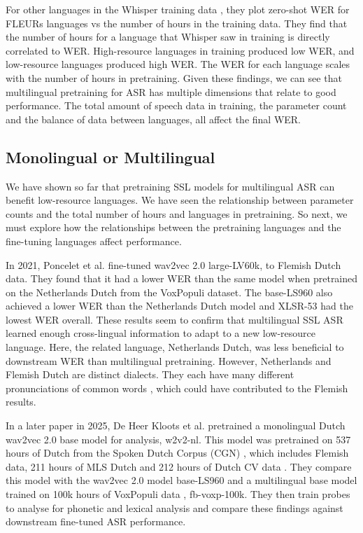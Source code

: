 For other languages in the Whisper training data \cite{whisper}, they plot zero-shot WER for FLEURs \cite{FLEURS} languages vs the number of hours in the training data. They find that the number of hours for a language that Whisper saw in training is directly correlated to WER. High-resource languages in training produced low WER, and low-resource languages produced high WER. The WER for each language scales with the number of hours in pretraining. Given these findings, we can see that multilingual pretraining for ASR has multiple dimensions that relate to good performance. The total amount of speech data in training, the parameter count and the balance of data between languages, all affect the final WER. 



\subsection{Monolingual or Multilingual}
We have shown so far that pretraining SSL models for multilingual ASR can benefit low-resource languages. We have seen the relationship between parameter counts and the total number of hours and languages in pretraining. So next, we must explore how the relationships between the pretraining languages and the fine-tuning languages affect performance.

In 2021, Poncelet et al. \cite{poncelet2021comparison} fine-tuned wav2vec 2.0 large-LV60k, to Flemish Dutch data. They found that it had a lower WER than the same model when pretrained on the Netherlands Dutch from the VoxPopuli \cite{wang-etal-2021-voxpopuli} dataset. The base-LS960 also achieved a lower WER than the Netherlands Dutch model and XLSR-53 had the lowest WER overall. These results seem to confirm that multilingual SSL ASR learned enough cross-lingual information to adapt to a new low-resource language. Here, the related language, Netherlands Dutch, was less beneficial to downstream WER than multilingual pretraining. However, Netherlands and Flemish Dutch are distinct dialects. They each have many different pronunciations of common words \cite{ipahandbook_1999}, which could have contributed to the Flemish results.


In a later paper in 2025, De Heer Kloots et al. \cite{deheerkloots25_interspeech} pretrained a monolingual Dutch wav2vec 2.0 base model for analysis, w2v2-nl. This model was pretrained on 537 hours of Dutch from the Spoken Dutch Corpus (CGN) \cite{schuurman2003cgn}, which includes Flemish data, 211 hours of MLS Dutch \cite{MLS} and 212 hours of Dutch CV data \cite{ardila-etal-2020-common}. They compare this model with the  wav2vec 2.0 model base-LS960 and a multilingual base model trained on 100k hours of VoxPopuli data \cite{wang-etal-2021-voxpopuli}, fb-voxp-100k. They then train probes to analyse for phonetic and lexical analysis and compare these findings against downstream fine-tuned ASR performance. 

